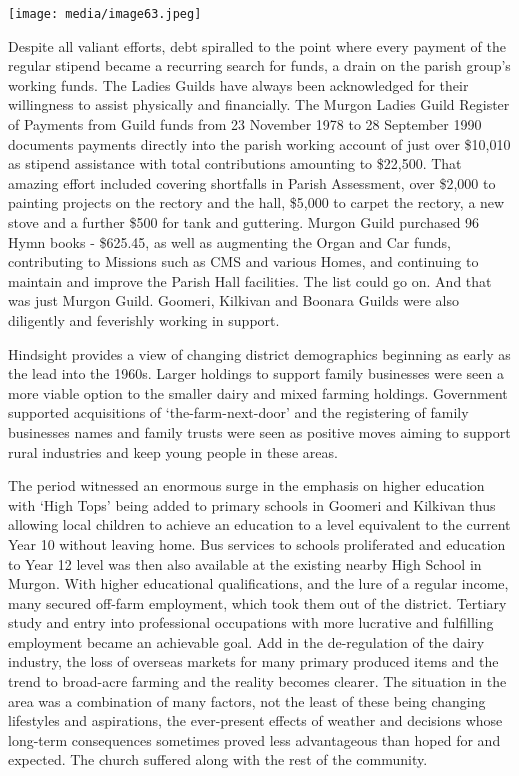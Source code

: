 \texttt{[image: media/image63.jpeg]}

Despite all valiant efforts, debt spiralled to the point where every payment of the regular stipend became a recurring search for funds, a drain on the parish group's working funds. The Ladies Guilds have always been acknowledged for their willingness to assist physically and financially. The Murgon Ladies Guild Register of Payments from Guild funds from 23 November 1978 to 28 September 1990 documents payments directly into the parish working account of just over \$10,010 as stipend assistance with total contributions amounting to \$22,500. That amazing effort included covering shortfalls in Parish Assessment, over \$2,000 to painting projects on the rectory and the hall, \$5,000 to carpet the rectory, a new stove and a further \$500 for tank and guttering. Murgon Guild purchased 96 Hymn books - \$625.45, as well as augmenting the Organ and Car funds, contributing to Missions such as CMS and various Homes, and continuing to maintain and improve the Parish Hall facilities. The list could go on. And that was just Murgon Guild. Goomeri, Kilkivan and Boonara Guilds were also diligently and feverishly working in support.

Hindsight provides a view of changing district demographics beginning as early as the lead into the 1960s. Larger holdings to support family businesses were seen a more viable option to the smaller dairy and mixed farming holdings. Government supported acquisitions of `the-farm-next-door' and the registering of family businesses names and family trusts were seen as positive moves aiming to support rural industries and keep young people in these areas.

The period witnessed an enormous surge in the emphasis on higher education with `High Tops' being added to primary schools in Goomeri and Kilkivan thus allowing local children to achieve an education to a level equivalent to the current Year 10 without leaving home. Bus services to schools proliferated and education to Year 12 level was then also available at the existing nearby High School in Murgon. With higher educational qualifications, and the lure of a regular income, many secured off-farm employment, which took them out of the district. Tertiary study and entry into professional occupations with more lucrative and fulfilling employment became an achievable goal. Add in the de-regulation of the dairy industry, the loss of overseas markets for many primary produced items and the trend to broad-acre farming and the reality becomes clearer. The situation in the area was a combination of many factors, not the least of these being changing lifestyles and aspirations, the ever-present effects of weather and decisions whose long-term consequences sometimes proved less advantageous than hoped for and expected. The church suffered along with the rest of the community.

